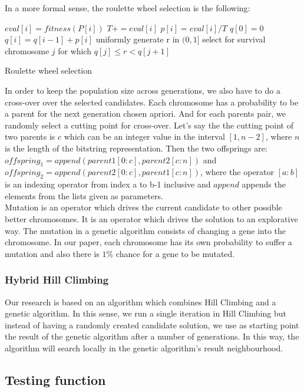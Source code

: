 \documentclass{article}
\begin{document}
In a more formal sense, the roulette wheel selection is the following:\\
\begin{algorithm}[H]
\SetAlgoLined
\LinesNumbered
{}
 
{
  $eval[i] = fitness(P[i])$\;
}
 
{
  $T += eval[i]$\;
}
 
{
  $p[i] = eval[i] / T$\;
}
 $q[0] = 0$\;
  {
  $q[i] = q[i - 1] + p[i]$\;
  }
  
 {
 uniformly generate r in $(0, 1]$\;
 select for survival chromosome $j$ for which $q[j] \leq r < q[j+1]$\;
 }
\caption{Roulette wheel selection}
\end{algorithm}
In order to keep the population size across generations, we also have to do a cross-over over the selected candidates. Each chromosome has a probability to be a parent for the next generation chosen apriori. And for each parents pair, we randomly select a cutting point for cross-over. Let's say the the cutting point of two parents is $c$ which can be an integer value in the interval $[1, n-2]$, where $n$ is the length of the bitstring representation. Then the two offsprings are: $offspring_1 = append(parent1[0:c], parent2[c:n])$ and $offspring_2 = append(parent2[0:c], parent1[c:n])$, where the operator $[a:b]$ is an indexing operator from index a to b-1 inclusive and $append$ appends the elements from the lists given as parameters.\\
Mutation is an operator which drives the current candidate to other possible better chromosomes. It is an operator which drives the solution to an explorative way. The mutation in a genetic algorithm consists of changing a gene into the chromosome. In our paper,  each chromosome has its own probability to suffer a mutation and also there is $1\%$ chance for a gene to be mutated.
\subsubsection{Hybrid Hill Climbing}
Our research is based on an algorithm which combines Hill Climbing and a genetic algorithm. In this sense, we run a single iteration in Hill Climbing but instead of having a randomly created candidate solution, we use as starting point the result of the genetic algorithm after a number of generations. In this way, the algorithm will search locally in the genetic algorithm's result neighbourhood.
\subsection{Testing function}
\end{document}
